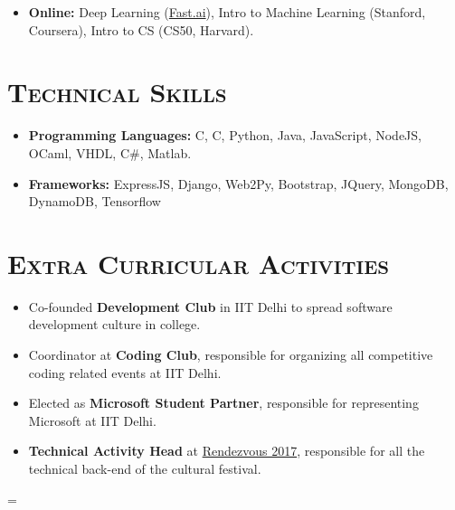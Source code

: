 \documentclass{article}
\newenvironment{longversion}{}{} %
\newenvironment{absolutelynopagebreak}
  {\par\nobreak\vfil\penalty0\vfilneg
   \vtop\bgroup}
  {\par\xdef\tpd{\the\prevdepth}\egroup
   \prevdepth=\tpd}
\newcommand{\CPP}
{C\nolinebreak[4]\hspace{-.05em}\raisebox{.22ex}{\footnotesize\bf ++}}
\newcommand{\tmpsection}[1]{}
\let\tmpsection=\section
\renewcommand{\section}[1]{\tmpsection*{\textsc{#1}}}
\begin{document}
\begin{absolutelynopagebreak}
\begin{longversion}
\begin{itemize}
\item \textbf{Online:}
Deep Learning (\href{http://www.fast.ai/}{Fast.ai}), Intro to Machine Learning (Stanford, Coursera), Intro to CS (CS50, Harvard).
\end{itemize}
\end{longversion}


\begin{longversion}
\section{Technical Skills}\begin{itemize}
\item \textbf{Programming Languages:}  C, \CPP, Python, Java, JavaScript, NodeJS, OCaml, VHDL, C\#, Matlab.
\item \textbf{Frameworks:} ExpressJS, Django, Web2Py, Bootstrap, JQuery, MongoDB, DynamoDB, Tensorflow


\end{itemize}

\end{longversion}

\section{Extra Curricular Activities}


\begin{itemize}
    \setlength\itemsep{0em}
    \item Co-founded \textbf{Development Club} in IIT Delhi to spread software development culture in college.
    \item Coordinator at \textbf{Coding Club}, responsible for organizing all competitive coding related events at IIT Delhi.
    \item Elected as \textbf{Microsoft Student Partner}, responsible for representing Microsoft at IIT Delhi. 
    \item \textbf{Technical Activity Head} at \href{http://rdv-iitd.com/}{Rendezvous 2017}, responsible for all the technical back-end of the cultural festival.
     
\end{itemize}
\end{absolutelynopagebreak}
\end{document}
